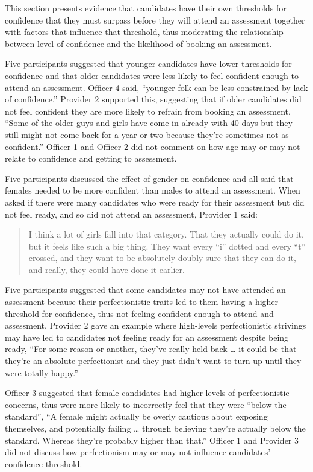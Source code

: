 \documentclass[
  12pt,
  a4paper,
]{book}
\begin{document}
This section presents evidence that candidates have their own thresholds for confidence that they must surpass before they will attend an assessment together with factors that influence that threshold, thus moderating the relationship between level of confidence and the likelihood of booking an assessment.

Five participants suggested that younger candidates have lower thresholds for confidence and that older candidates were less likely to feel confident enough to attend an assessment. Officer 4 said, ``younger folk can be less constrained by lack of confidence.'' Provider 2 supported this, suggesting that if older candidates did not feel confident they are more likely to refrain from booking an assessment, ``Some of the older guys and girls have come in already with 40 days but they still might not come back for a year or two because they're sometimes not as confident.'' Officer 1 and Officer 2 did not comment on how age may or may not relate to confidence and getting to assessment.

Five participants discussed the effect of gender on confidence and all said that females needed to be more confident than males to attend an assessment. When asked if there were many candidates who were ready for their assessment but did not feel ready, and so did not attend an assessment, Provider 1 said:

\begin{quote}
I think a lot of girls fall into that category. That they actually could do it, but it feels like such a big thing. They want every ``i'' dotted and every ``t'' crossed, and they want to be absolutely doubly sure that they can do it, and really, they could have done it earlier.
\end{quote}

Five participants suggested that some candidates may not have attended an assessment because their perfectionistic traits led to them having a higher threshold for confidence, thus not feeling confident enough to attend and assessment. Provider 2 gave an example where high-levels perfectionistic strivings may have led to candidates not feeling ready for an assessment despite being ready, ``For some reason or another, they've really held back \ldots{} it could be that they're an absolute perfectionist and they just didn't want to turn up until they were totally happy.''

Officer 3 suggested that female candidates had higher levels of perfectionistic concerns, thus were more likely to incorrectly feel that they were ``below the standard'', ``A female might actually be overly cautious about exposing themselves, and potentially failing \ldots{} through believing they're actually below the standard. Whereas they're probably higher than that.'' Officer 1 and Provider 3 did not discuss how perfectionism may or may not influence candidates' confidence threshold.
\end{document}
